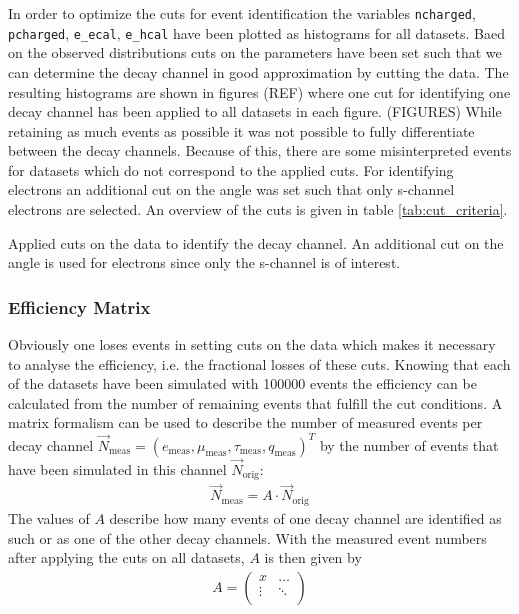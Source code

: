 \documentclass[11pt, a4paper]{article}
\numberwithin{equation}{section}
\newcommand{\korr}[1]{{\color{red}(#1)}}
\begin{document}
In order to optimize the cuts for event identification the variables \texttt{ncharged}, \texttt{pcharged}, \texttt{e\_ecal}, \texttt{e\_hcal} have been plotted as histograms for all datasets.
Baed on the observed distributions cuts on the parameters have been set such that we can determine the decay channel in good approximation by cutting the data.
The resulting histograms are shown in figures \korr{REF} where one cut for identifying one decay channel has been applied to all datasets in each figure.
\korr{FIGURES}
While retaining as much events as possible it was not possible to fully differentiate between the decay channels.
Because of this, there are some misinterpreted events for datasets which do not correspond to the applied cuts.
For identifying electrons an additional cut on the angle was set such that only s-channel electrons are selected.
An overview of the cuts is given in table \ref{tab:cut_criteria}.
\begin{table}[h]
	\centering
	
	\caption{Applied cuts on the data to identify the decay channel. An additional cut on the angle is used for electrons since only the s-channel is of interest.}
	\label{tab:cut_criteria}
\end{table}

\subsubsection{Efficiency Matrix}

Obviously one loses events in setting cuts on the data which makes it necessary to analyse the efficiency, i.e. the fractional losses of these cuts.
Knowing that each of the datasets have been simulated with \num{100000} events the efficiency can be calculated from the number of remaining events that fulfill the cut conditions.
A matrix formalism can be used to describe the number of measured events per decay channel $\vec{N}_\mathrm{meas}=(e_\mathrm{meas}, \mu_\mathrm{meas}, \tau_\mathrm{meas}, q_\mathrm{meas})^T$ by the number of events that have been simulated in this channel $\vec{N}_\mathrm{orig}$:
\begin{align}
\vec{N}_\mathrm{meas} = A \cdot \vec{N}_\mathrm{orig}
\end{align}
The values of $A$ describe how many events of one decay channel are identified as such or as one of the other decay channels.
With the measured event numbers after applying the cuts on all datasets, $A$ is then given by
\begin{align}
A = \begin{pmatrix}
	x & \dots \\
	\vdots & \ddots \\
	\end{pmatrix}
\end{align}
\end{document}

